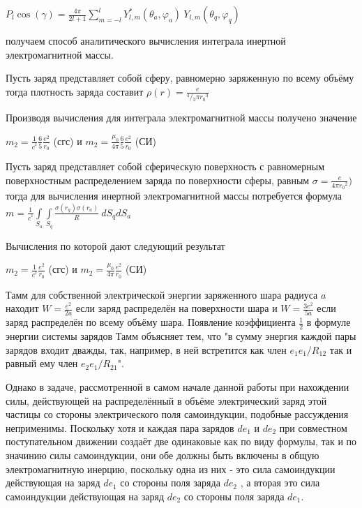 \documentclass{article}
\begin{document}
${{P}_{l}}\cos \left( \gamma  \right)=\frac{4\pi }{2l+1}\sum\limits_{m=-l}^{l}{Y_{l,m}^{*}\left( {{\theta }_{a}},{{\varphi }_{a}} \right)}\ {{Y}_{l,m}}\left( {{\theta }_{q}},{{\varphi }_{q}} \right)$

получаем способ аналитического вычисления интеграла инертной электромагнитной массы.

Пусть заряд представляет собой сферу, равномерно заряженную по всему объёму тогда плотность заряда составит $\rho \left( r \right)=\frac{e}{{}^{4}/{}_{3}\pi {{r}_{0}}^{3}}$

Производя вычисления для интеграла электромагнитной массы получено значение 

$m_2 =\frac{1}{{{c}^{^{2}}}}\frac{6}{5}\frac{e^2}{{{r}_{0}}}$ (сгс) и
$m_2 =\frac{{{\mu }_{0}}}{4\pi }\frac{6}{5}\frac{e^2}{{{r}_{0}}}$ (СИ)

Пусть заряд представляет собой сферическую поверхность с равномерным поверхностным распределением заряда по поверхности сферы, равным $\sigma=\frac{e}{4\pi {{r}_{0}}^{2}})$ тогда для вычисления инертной электромагнитной массы потребуется формула
$m=\frac{1}{{{c}^{^{2}}}}\int\limits_{{{S}_{a}}}{\int\limits_{{{S}_{q}}}{\frac{\sigma \left( {{r}_{q}} \right)\sigma \left( {{r}_{a}} \right)}{R}}}\ d{{S}_{q}}d{{S}_{a}}$

Вычисления по которой дают следующий результат

$m_2 =\frac{1}{{{c}^{^{2}}}}\frac{e^2}{{{r}_{0}}}$ (сгс) и
$m_2 =\frac{{{\mu }_{0}}}{4\pi }\frac{e^2}{{{r}_{0}}}$ (СИ)


Тамм \cite{tamm} для собственной электрической энергии заряженного шара радиуса $a$ находит $W=\frac{e^2}{2a}$ если заряд распределён на поверхности шара и $W=\frac{3e^2}{5a}$ если заряд распределён по всему объёму шара. Появление коэффициента $\frac{1}{2}$  в формуле энергии системы зарядов Тамм объясняет тем, что "в сумму энергия каждой пары зарядов входит дважды, так, например, в ней встретится как член ${e_{1}}{e_{1}}/{R_{12}}$ так и равный ему член ${e_{2}}{e_{1}}/{R_{21}}$".

Однако в задаче, рассмотренной в самом начале данной работы при нахождении силы, действующей на распределённый в объёме электрический заряд этой частицы со стороны электрического поля самоиндукции, подобные рассуждения неприменимы. Поскольку хотя и каждая пара зарядов $d{e}_{1}$ и $d{e}_{2}$ при совместном поступательном движении создаёт две одинаковые как по виду формулы, так и по значинию силы самоиндукции, они обе должны быть включены в общую электромагнитную инерцию, поскольку одна из них - это сила самоиндукции действующая на заряд $d{e}_{1}$  со стороны поля заряда $d{e}_{2}$ , а вторая это сила самоиндукции действующая на заряд $d{e}_{2}$  со стороны поля заряда $d{e}_{1}$.
\end{document}
